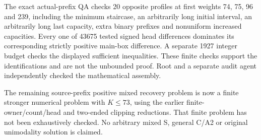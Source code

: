 The exact actual-prefix QA checks 20 opposite profiles at first weights
74, 75, 96 and 239, including the minimum staircase, an arbitrarily
long initial interval, an arbitrarily long last capacity, extra binary
prefixes and nonuniform increased capacities.  Every one of 43675
tested signed head differences dominates its corresponding strictly
positive main-box difference.  A separate 1927 integer budget checks
the displayed sufficient inequalities.  These finite checks support
the identifications and are not the unbounded proof.  Root and a
separate audit agent independently checked the mathematical assembly.

The remaining source-prefix positive mixed recovery problem is now
a finite stronger numerical problem with $K\le73$, using the earlier
finite-owner/count/head and two-ended clipping reductions.  That
finite problem has not been exhaustively checked.  No arbitrary
mixed S, general C/A2 or original unimodality solution is claimed.
